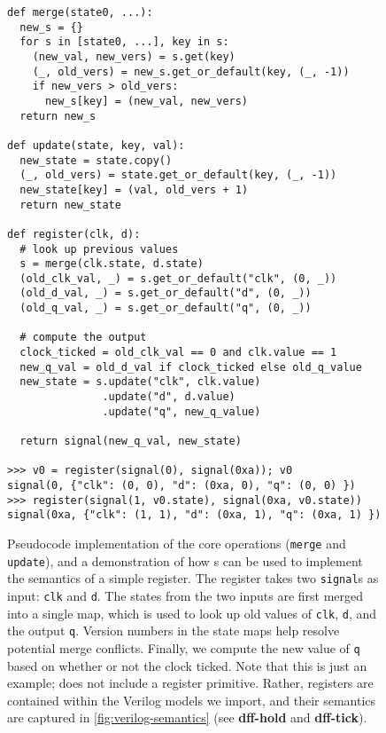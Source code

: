 \begin{figure} 
\begin{verbatim}
def merge(state0, ...):
  new_s = {}
  for s in [state0, ...], key in s:
    (new_val, new_vers) = s.get(key)
    (_, old_vers) = new_s.get_or_default(key, (_, -1))
    if new_vers > old_vers:
      new_s[key] = (new_val, new_vers)
  return new_s

def update(state, key, val):
  new_state = state.copy()
  (_, old_vers) = state.get_or_default(key, (_, -1))
  new_state[key] = (val, old_vers + 1)
  return new_state

def register(clk, d):
  # look up previous values
  s = merge(clk.state, d.state)
  (old_clk_val, _) = s.get_or_default("clk", (0, _))
  (old_d_val, _) = s.get_or_default("d", (0, _))
  (old_q_val, _) = s.get_or_default("q", (0, _))

  # compute the output
  clock_ticked = old_clk_val == 0 and clk.value == 1
  new_q_val = old_d_val if clock_ticked else old_q_value
  new_state = s.update("clk", clk.value)
               .update("d", d.value)
               .update("q", new_q_value)
  
  return signal(new_q_val, new_state)

>>> v0 = register(signal(0), signal(0xa)); v0
signal(0, {"clk": (0, 0), "d": (0xa, 0), "q": (0, 0) })
>>> register(signal(1, v0.state), signal(0xa, v0.state))
signal(0xa, {"clk": (1, 1), "d": (0xa, 1), "q": (0xa, 1) })
\end{verbatim}
    \caption{
Pseudocode implementation 
  of the core \signal operations
  (\texttt{merge} and \texttt{update}),
  and a demonstration of how \signal{}s
  can be used to implement the semantics
  of a simple register. 
The register takes two \texttt{signal}s as input:
  \texttt{clk} and \texttt{d}.
The states from the two inputs are first merged
  into a single map,
  which is used to look up old values of
  \texttt{clk}, \texttt{d},
  and the output \texttt{q}. 
Version numbers in the state maps
  help resolve potential merge conflicts.
Finally, we compute
  the new value of \texttt{q}
  based on whether or not
  the clock ticked. 
Note that this is just an example;
  \lrir does not include
  a register primitive.
Rather, registers are contained within
  the Verilog models
  we import, and their semantics
  are captured in 
  \cref{fig:verilog-semantics}
  (see \textbf{dff-hold} and \textbf{dff-tick}).
}
    \label{fig:signal-complete}
\end{figure}